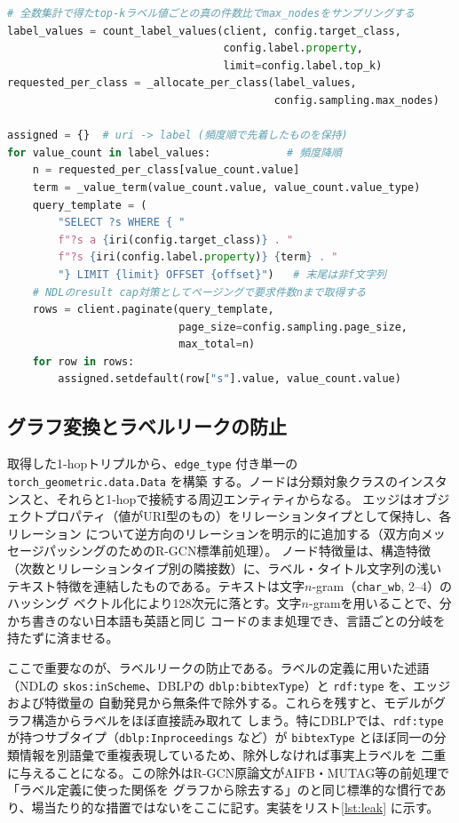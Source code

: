 \documentclass[dvipdfmx,twoside,11pt]{article}
\begin{document}
\begin{lstlisting}[language=Python, caption={ラベル値ごとの層化抽出（\texttt{rdf2graph/convert/labels.py}）。全数集計の真の比率でサンプリングし、層ごとにページングで取得する。}, label={lst:strat}]
# 全数集計で得たtop-kラベル値ごとの真の件数比でmax_nodesをサンプリングする
label_values = count_label_values(client, config.target_class,
                                  config.label.property,
                                  limit=config.label.top_k)
requested_per_class = _allocate_per_class(label_values,
                                          config.sampling.max_nodes)

assigned = {}  # uri -> label (頻度順で先着したものを保持)
for value_count in label_values:            # 頻度降順
    n = requested_per_class[value_count.value]
    term = _value_term(value_count.value, value_count.value_type)
    query_template = (
        "SELECT ?s WHERE { "
        f"?s a {iri(config.target_class)} . "
        f"?s {iri(config.label.property)} {term} . "
        "} LIMIT {limit} OFFSET {offset}")   # 末尾は非f文字列
    # NDLのresult cap対策としてページングで要求件数nまで取得する
    rows = client.paginate(query_template,
                           page_size=config.sampling.page_size,
                           max_total=n)
    for row in rows:
        assigned.setdefault(row["s"].value, value_count.value)
\end{lstlisting}

\subsection{グラフ変換とラベルリークの防止}

取得した1-hopトリプルから、\texttt{edge\_type} 付き単一の \texttt{torch\_geometric.data.Data} を構築
する。ノードは分類対象クラスのインスタンスと、それらと1-hopで接続する周辺エンティティからなる。
エッジはオブジェクトプロパティ（値がURI型のもの）をリレーションタイプとして保持し、各リレーション
について逆方向のリレーションを明示的に追加する（双方向メッセージパッシングのためのR-GCN標準前処理）。
ノード特徴量は、構造特徴（次数とリレーションタイプ別の隣接数）に、ラベル・タイトル文字列の浅い
テキスト特徴を連結したものである。テキストは文字$n$-gram（\texttt{char\_wb}, 2--4）のハッシング
ベクトル化により128次元に落とす。文字$n$-gramを用いることで、分かち書きのない日本語も英語と同じ
コードのまま処理でき、言語ごとの分岐を持たずに済ませる。

ここで重要なのが、ラベルリークの防止である。ラベルの定義に用いた述語（NDLの
\texttt{skos:inScheme}、DBLPの \texttt{dblp:bibtexType}）と \texttt{rdf:type} を、エッジおよび特徴量の
自動発見から無条件で除外する。これらを残すと、モデルがグラフ構造からラベルをほぼ直接読み取れて
しまう。特にDBLPでは、\texttt{rdf:type} が持つサブタイプ（\texttt{dblp:Inproceedings} など）が
\texttt{bibtexType} とほぼ同一の分類情報を別語彙で重複表現しているため、除外しなければ事実上ラベルを
二重に与えることになる。この除外はR-GCN原論文がAIFB・MUTAG等の前処理で「ラベル定義に使った関係を
グラフから除去する」のと同じ標準的な慣行であり、場当たり的な措置ではないをここに記す。実装をリスト\ref{lst:leak}
に示す。
\end{document}
